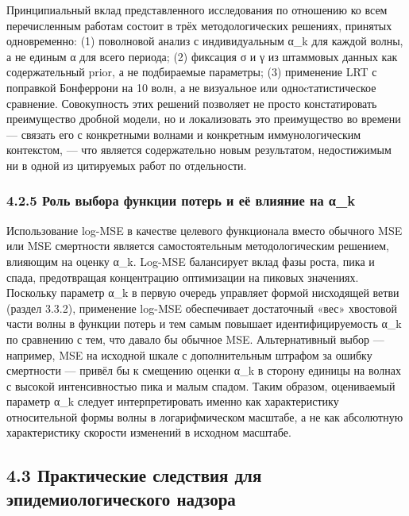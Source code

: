 \documentclass[12pt]{article}
\begin{document}
Принципиальный вклад представленного исследования по отношению ко всем
перечисленным работам состоит в трёх методологических решениях, принятых
одновременно: (1) поволновой анализ с индивидуальным α\_k для каждой
волны, а не единым α для всего периода; (2) фиксация σ и γ из штаммовых
данных как содержательный prior, а не подбираемые параметры; (3)
применение LRT с поправкой Бонферрони на 10 волн, а не визуальное или
одноcтатистическое сравнение. Совокупность этих решений позволяет не
просто констатировать преимущество дробной модели, но и локализовать это
преимущество во времени --- связать его с конкретными волнами и
конкретным иммунологическим контекстом, --- что является содержательно
новым результатом, недостижимым ни в одной из цитируемых работ по
отдельности.

\subsubsection{4.2.5 Роль выбора функции потерь и её влияние на
α\_k}\label{ux440ux43eux43bux44c-ux432ux44bux431ux43eux440ux430-ux444ux443ux43dux43aux446ux438ux438-ux43fux43eux442ux435ux440ux44c-ux438-ux435ux451-ux432ux43bux438ux44fux43dux438ux435-ux43dux430-ux3b1_k-1}

Использование log-MSE в качестве целевого функционала вместо обычного
MSE или MSE смертности является самостоятельным методологическим
решением, влияющим на оценку α\_k. Log-MSE балансирует вклад фазы роста,
пика и спада, предотвращая концентрацию оптимизации на пиковых
значениях. Поскольку параметр α\_k в первую очередь управляет формой
нисходящей ветви (раздел 3.3.2), применение log-MSE обеспечивает
достаточный «вес» хвостовой части волны в функции потерь и тем самым
повышает идентифицируемость α\_k по сравнению с тем, что давало бы
обычное MSE. Альтернативный выбор --- например, MSE на исходной шкале с
дополнительным штрафом за ошибку смертности --- привёл бы к смещению
оценки α\_k в сторону единицы на волнах с высокой интенсивностью пика и
малым спадом. Таким образом, оцениваемый параметр α\_k следует
интерпретировать именно как характеристику относительной формы волны в
логарифмическом масштабе, а не как абсолютную характеристику скорости
изменений в исходном масштабе.

\subsection{4.3 Практические следствия для эпидемиологического
надзора}\label{ux43fux440ux430ux43aux442ux438ux447ux435ux441ux43aux438ux435-ux441ux43bux435ux434ux441ux442ux432ux438ux44f-ux434ux43bux44f-ux44dux43fux438ux434ux435ux43cux438ux43eux43bux43eux433ux438ux447ux435ux441ux43aux43eux433ux43e-ux43dux430ux434ux437ux43eux440ux430}
\end{document}
